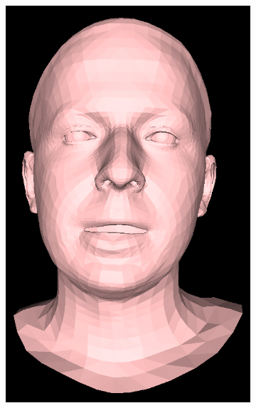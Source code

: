 \documentclass[12pt]{report}
\begin{document}
\begin{figure}[h]
\begin{subfigure}[b]{0.19\textwidth}
        \includegraphics[width=\textwidth]{figures/voca_exp/vocaset_exp3.png}
    \end{subfigure}
    \begin{subfigure}[b]{0.19\textwidth}

\end{subfigure}
\end{figure}
\end{document}
